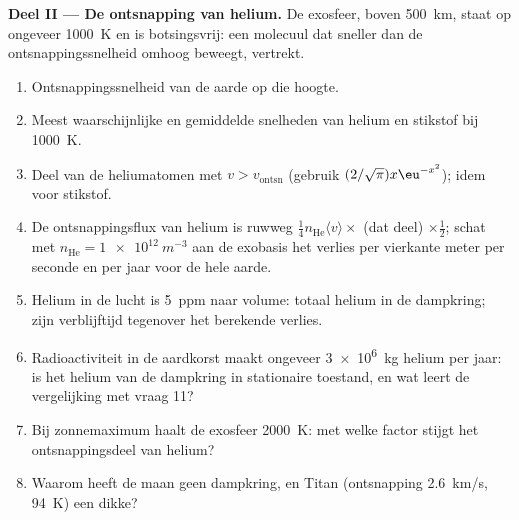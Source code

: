 \begin{problem}
\textbf{Deel II --- De ontsnapping van helium.}
De exosfeer, boven \qty{500}{km}, staat op ongeveer \qty{1000}{K} en is
botsingsvrij: een molecuul dat sneller dan de ontsnappingssnelheid omhoog beweegt,
vertrekt.
\begin{enumerate}[resume]
  \item Ontsnappingssnelheid van de aarde op die hoogte.
  \item Meest waarschijnlijke en gemiddelde snelheden van helium en stikstof bij
        \qty{1000}{K}.
  \item Deel van de heliumatomen met $v > v_{\text{ontsn}}$ (gebruik
        $(2/\sqrt\pi)x\eu^{-x^2}$); idem voor stikstof.
  \item De ontsnappingsflux van helium is ruwweg
        $\tfrac14n_{\text{He}}\langle
        v\rangle \times$ (dat deel)
        $\times\tfrac12$; schat met
        $n_{\text{He}}
        = \qty{1e12}{m^{-3}}$ aan de exobasis het
        verlies per vierkante
        meter per seconde en per jaar voor de hele aarde.
  \item Helium in de lucht is \qty{5}{ppm} naar volume: totaal helium in de
        dampkring; zijn verblijftijd tegenover het berekende verlies.
  \item Radioactiviteit in de aardkorst maakt ongeveer \qty{3e6}{kg} helium
        per jaar: is het helium van de dampkring in stationaire toestand, en wat
        leert de vergelijking met vraag 11?
  \item Bij zonnemaximum haalt de exosfeer \qty{2000}{K}: met welke
        factor stijgt het ontsnappingsdeel van helium?
  \item Waarom heeft de maan geen dampkring, en Titan (ontsnapping
        \qty{2.6}{km/s}, \qty{94}{K}) een dikke?
\end{enumerate}


\end{problem}
